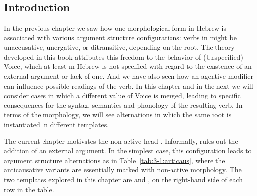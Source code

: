 \chapter{\vz}
\label{chap:vz}

\section{Introduction} \label{vz:intro}
In the previous chapter we saw how one morphological form in Hebrew is associated with various argument structure configurations: verbs in {\tkal} might be unaccusative, unergative,  or ditransitive, depending on the root. The theory developed in this book attributes this freedom to the behavior of (Unspecified) Voice, which at least in Hebrew is not specified with regard to the existence of an external argument or lack of one. And we have also seen how an agentive modifier can influence possible readings of the verb. In this chapter and in the next we will consider cases in which a different value of Voice is merged, leading to specific consequences for the syntax, semantics and phonology of the resulting verb. In terms of the morphology, we will see alternations in which the same root is instantiated in different templates.

The current chapter motivates the non-active head {\vz}. Informally,\linebreak {\vz} rules out the addition of an external argument. In the simplest case, this configuration leads to argument structure alternations as in Table~\ref{tab:3-1:anticaus}, where the anticausative variants are essentially marked with non-active morphology. The two templates explored in this chapter are {\tnif} and {\thit}, on the right-hand side of each row in the table.

\begin{table}
\caption{Two pairs of alternations\label{tab:3-1:anticaus}} 
\end{table}

